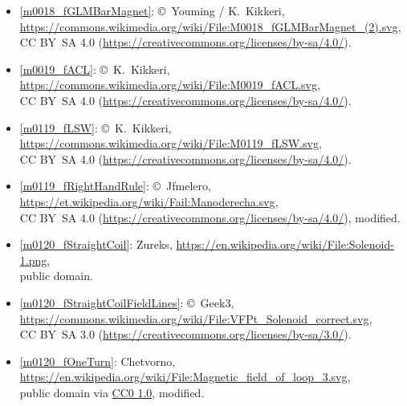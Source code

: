 \begin{itemize}

\item[Fig.] \label{m0018_fGLMBarMagnet_Credit}
  \ref{m0018_fGLMBarMagnet}:
  \copyright~Youming / K.\ Kikkeri, 
  \url{https://commons.wikimedia.org/wiki/File:M0018_fGLMBarMagnet_(2).svg},\\ 
  CC BY~SA 4.0 (\url{https://creativecommons.org/licenses/by-sa/4.0/}).

\item[Fig.] \label{m0019_fACL_Credit}
  \ref{m0019_fACL}:
  \copyright~K.\ Kikkeri, 
  \url{https://commons.wikimedia.org/wiki/File:M0019_fACL.svg},\\ 
  CC BY~SA 4.0 (\url{https://creativecommons.org/licenses/by-sa/4.0/}).

\item[Fig.] \label{m0119_fLSW_Credit}
  \ref{m0119_fLSW}:
  \copyright~K.\ Kikkeri, 
  \url{https://commons.wikimedia.org/wiki/File:M0119_fLSW.svg},\\ 
  CC BY~SA 4.0 (\url{https://creativecommons.org/licenses/by-sa/4.0/}).

\item[Fig.] \label{m0119_fRightHandRule_Credit}
  \ref{m0119_fRightHandRule}:
  \copyright~Jfmelero, 
  \url{https://et.wikipedia.org/wiki/Fail:Manoderecha.svg},\\ 
  CC BY~SA 4.0 (\url{https://creativecommons.org/licenses/by-sa/4.0/}),
  modified.

\item[Fig.] \label{m0120_fStraightCoil_Credit}
  \ref{m0120_fStraightCoil}:
  Zureks,  
  \url{https://en.wikipedia.org/wiki/File:Solenoid-1.png},\\ 
  public domain.

\item[Fig.] \label{m0120_fStraightCoilFieldLines_Credit}
  \ref{m0120_fStraightCoilFieldLines}:
  \copyright~Geek3, 
  \url{https://commons.wikimedia.org/wiki/File:VFPt_Solenoid_correct.svg},\\ 
  CC BY~SA 3.0 (\url{https://creativecommons.org/licenses/by-sa/3.0/}).

\item[Fig.] \label{m0120_fOneTurn_Credit}
  \ref{m0120_fOneTurn}:
  Chetvorno,  
  \url{https://en.wikipedia.org/wiki/File:Magnetic_field_of_loop_3.svg},\\ 
  public domain via \href{https://creativecommons.org/publicdomain/zero/1.0/deed.en}{CC0 1.0},
  modified.


\end{itemize}
